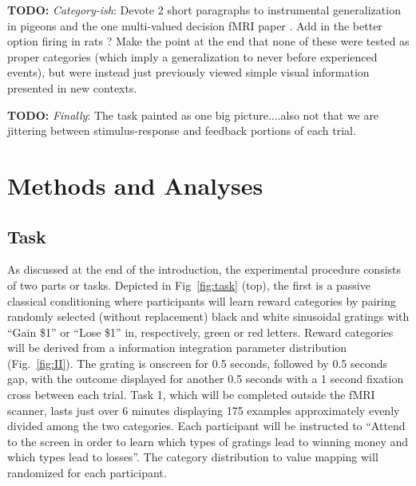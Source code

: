 \documentclass[doc,12pt]{apa}        %
\begin{document}
\textbf{TODO:}
\emph{Category-ish}: Devote 2 short paragraphs to instrumental generalization in pigeons and the one multi-valued decision fMRI paper \cite{Kahnt:2010p7677}.  Add in the better option firing in rats \cite{Roesch:2007p2519}?  Make the point at the end that none of these were tested as proper categories (which imply a generalization to never before experienced events), but were instead just previously viewed simple visual information presented in new contexts.


\textbf{TODO:}
\emph{Finally}:  The task painted as one big picture....also not that we are jittering between stimulus-response and feedback portions of each trial.

\section{Methods and Analyses} %
\label{sec:methods}
\subsection{Task} %
\label{sub:task}
As discussed at the end of the introduction, the experimental procedure consists of two parts or tasks.  Depicted in Fig~\ref{fig:task} (top), the first is a passive classical conditioning where participants will learn reward categories by pairing randomly selected (without replacement) black and white sinusoidal gratings with ``Gain \$1'' or ``Lose \$1'' in, respectively, green or red letters.  Reward categories will be derived from a information integration parameter distribution (Fig.~\ref{fig:II}).  The grating is onscreen for 0.5 seconds, followed by 0.5 seconds gap, with the outcome displayed for another 0.5 seconds with a 1 second fixation cross between each trial. Task 1, which will be completed outside the fMRI scanner, lasts just over 6 minutes displaying 175 examples approximately evenly divided among the two categories.  Each participant will be instructed to ``Attend to the screen in order to learn which types of gratings lead to winning money and which types lead to losses''.  The category distribution to value mapping will randomized for each participant.
\end{document}
